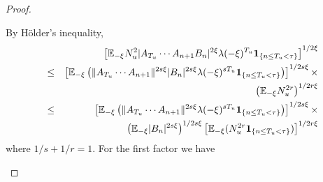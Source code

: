 \documentclass{article}
\theoremstyle{remark}
\begin{document}
\begin{proof}
\begin{enumerate}
\begin{enumerate}
      By H\"older's inequality,
      \begin{eqnarray}
        && \left[ \mathbb{E}_{-\xi} N_u^2 
          |A_{T_u} \cdots A_{n+1} B_n|^{2\xi}
          \lambda(-\xi)^{T_u}
          \mathbf{1}_{\{n \leq T_u < \tau\}} \right]^{1/2\xi} \nonumber \\
        &\leq& 
        \left[\mathbb{E}_{-\xi}\left( \|A_{T_u} \cdots A_{n+1}\|^{2s\xi}
            |B_n|^{2s\xi}
            \lambda(-\xi)^{s T_u}
            \mathbf{1}_{\{n \leq T_u < \tau\}}\right)\right]^{1/2s\xi}
        \times\nonumber \\
        && \left(\mathbb{E}_{-\xi} N_u^{2r}\right)^{1/2r\xi} \nonumber \\
        &\leq& 
        \left[\mathbb{E}_{-\xi}\left( \|A_{T_u} \cdots A_{n+1}\|^{2s\xi}
            \lambda(-\xi)^{s T_u}
            \mathbf{1}_{\{n \leq T_u < \tau\}}\right)\right]^{1/2s\xi}
        \times\nonumber \\
        && \left(\mathbb{E}_{-\xi}|B_n|^{2s\xi}\right)^{1/2s\xi}
        \left[\mathbb{E}_{-\xi}(N_u^{2r}\mathbf{1}_{\{n \leq T_u < \tau\}})\right]^{1/2r\xi}
        \label{eq:xi_above_half}
      \end{eqnarray}
      where $1/s + 1/r = 1$. For the first factor we have


\end{enumerate}
\end{enumerate}
\end{proof}
\end{document}
